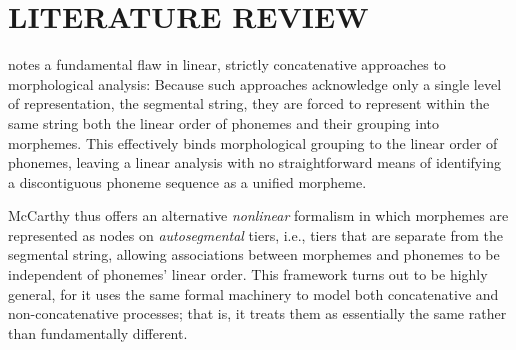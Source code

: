 \chapter{LITERATURE REVIEW}
\label{ch:lit-review}

\cite{mccarthy:1981} notes a fundamental flaw in linear, strictly concatenative approaches to morphological analysis: 
Because such approaches acknowledge only a single level of representation, the segmental string, they are forced to represent within the same string both the linear order of phonemes and their grouping into morphemes. This effectively binds morphological grouping to the linear order of phonemes, leaving a linear analysis 
with no straightforward means of identifying a discontiguous phoneme sequence as a unified morpheme.


McCarthy thus offers an alternative \emph{nonlinear} formalism in which morphemes are represented as nodes on \emph{autosegmental} tiers, 
i.e., tiers that are separate from the segmental string, allowing
associations between morphemes and phonemes to be independent of phonemes' linear order.
This framework turns out to be highly general, for it uses the same formal machinery to model both 
concatenative and non-concatenative processes; that is, it treats them as essentially the same rather than fundamentally different.


